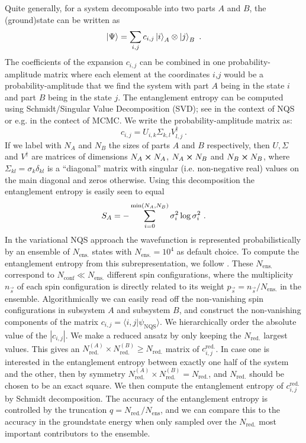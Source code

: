 	Quite generally, for a system decomposable into two parts $A$ and $B$, the (ground)state can be written as
	\begin{equation}
		\ket{\Psi} = \sum_{i,j} c_{i,j} \ket{i}_A \otimes \ket{j}_B~.
		\label{eq:stateDecomp}
	\end{equation}
	The coefficients of the expansion $c_{i,j}$ can be combined in one probability-amplitude matrix where each element at the coordinates $i$,$j$ would be a probability-amplitude that we find the system with part $A$ being in the state $i$ and part $B$ being in the state $j$. 
	The entanglement entropy can be computed
	using Schmidt/Singular Value Decomposition (SVD); see \cite{Shi_2019} in the context of NQS or e.g. \cite{2011arXiv1109.0104M} in the contect of MCMC. We write the probability-amplitude matrix as:
	\begin{equation}
		c_{i,j} = U_{i,k}\Sigma_{k,l}V^\dagger_{l,j}~.
	\end{equation}
	If we label with $N_A$ and $N_B$ the sizes of parts $A$ and $B$ respectively, then $U, \Sigma$ and $V^\dagger$ are matrices of dimensions $N_A \cross N_A$, $N_A \cross N_B$ and $N_B \cross N_B$, where $\Sigma_{kl}=\sigma_k\delta_{kl}$ is a ``diagonal'' matrix with singular (i.e. non-negative real) values on the main diagonal and zeros otherwise. 
	Using this decomposition the entanglement entropy is easily seen to equal
	\begin{equation}
		S_A = -\sum_{i=0}^{\text{min}(N_A, N_B)} \sigma_i^2 \log \sigma_i^2 \ .
	\end{equation}	
	In the variational NQS approach the wavefunction is represented probabilistically by an ensemble of $N_{\text{ens.}}$ states with $N_{\text{ens.}}=10^4$ as default choice. To compute the entanglement entropy from this subrepresentation, we follow \cite{Shi_2019}. These $N_{\text{ens.}}$ correspond to $N_{\text{conf}}\ll N_{\text{ens.}}$ different spin configurations, where the multiplicity $n_{\vec{s}}$ of each spin configuration is directly related to its weight $p_{\vec{s}}=n_{\vec{s}}/N_{\text{ens.}}$ in the ensemble. Algorithmically we can easily read off the non-vanishing spin configurations in subsystem $A$ and subsystem $B$, and construct the non-vanishing components of the matrix $c_{i,j}=\langle i,j|\psi_{\text{NQS}}\rangle$.	We hierarchically order the absolute value of the $|c_{i,j}|$. We make a reduced ansatz by only keeping the $N_{\text{red.}}$ largest values. This gives an $N_{\text{red.}}^{(A)}\times N_{\text{red.}}^{(B)} \geq N_{\text{red.}}$ matrix of $c_{i,j}^{\text{red.}}$.	In case one is interested in the entanglement entropy between exactly one half of the system and the other, then by symmetry $N_{\text{red.}}^{(A)}\times N_{\text{red.}}^{(B)} = N_{\text{red.}}$, and $N_{\text{red.}}$ should be chosen to be an exact square.	We then compute the entanglement entropy of $c_{i,j}^{\text{red.}}$ by Schmidt decomposition. 
	The accuracy of the entanglement entropy is controlled by the truncation $q=N_{\text{red.}}/N_{\text{ens}}$, and we can compare this to the accuracy in the groundstate energy when only sampled over the $N_{\text{red.}}$ most important contributors to the ensemble.
	
